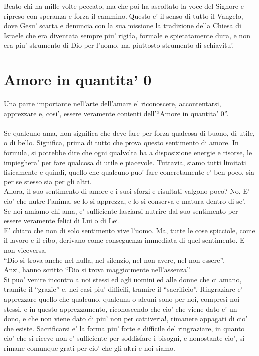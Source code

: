 Beato chi ha mille volte peccato, ma che poi ha ascoltato la voce del Signore e ripreso con speranza e forza il cammino. Questo e' il senso di tutto il Vangelo, dove Gesu' scarta e denuncia con la sua missione la tradizione della Chiesa di Israele che era diventata sempre piu' rigida, formale e spietatamente dura, e non era piu' strumento di Dio per l'uomo, ma piuttosto strumento di schiavitu'.

\section{Amore in quantita' 0}

Una parte importante nell'arte dell'amare e' riconoscere, accontentarsi, apprezzare e, cosi', essere veramente contenti dell'``Amore in quantita' 0''.\\
\leavevmode\\
Se qualcuno ama, non significa che deve fare per forza qualcosa di buono, di utile, o di bello. Significa, prima di tutto che prova questo sentimento di amore. In formula, si potrebbe dire che ogni qualvolta ha a disposizione energie e risorse, le impieghera' per fare qualcosa di utile e piacevole. Tuttavia, siamo tutti limitati fisicamente e quindi, quello che qualcuno puo' fare concretamente e' ben poco, sia per se stesso sia per gli altri.\\
Allora, il suo sentimento di amore e i suoi sforzi e risultati valgono poco? No. E' cio' che nutre l'anima, se lo si apprezza, e lo si conserva e matura dentro di se'.\\

Se noi amiamo chi ama, e' sufficiente lasciarsi nutrire dal suo sentimento per essere veramente felici di Lui o di Lei.\\
E' chiaro che non di solo sentimento vive l'uomo. Ma, tutte le cose spicciole, come il lavoro e il cibo, derivano come conseguenza immediata di quel sentimento. E non viceversa.\\

``Dio si trova anche nel nulla, nel silenzio, nel non avere, nel non essere''.\\
Anzi, hanno scritto ``Dio si trova maggiormente nell'assenza''.\\

Si puo' venire incontro a noi stessi ed agli uomini ed alle donne che ci amano, tramite il ``grazie'' e, nei casi piu' difficili, tramire il ``sacrificio''. Ringraziare e' apprezzare quello che qualcuno, qualcuna o alcuni sono per noi, compresi noi stessi, e in questo apprezzamento, riconoscendo che cio' che viene dato e' un dono, e che non viene dato di piu' non per cattiveria!, rimanere appagati di cio' che esiste. Sacrificarsi e' la forma piu' forte e difficile del ringraziare, in quanto cio' che si riceve non e' sufficiente per soddisfare i bisogni, e nonostante cio', si rimane comunque grati per cio' che gli altri e noi siamo. 


